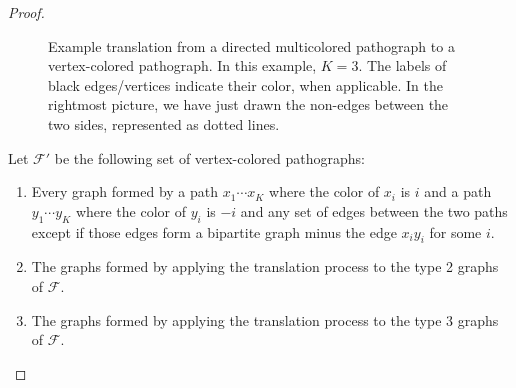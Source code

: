 \documentclass{article}
\newcommand{\alabvert}[4]{\node[dot, label={[label distance=-2pt] #4:{$#3$}}] (#1) at (#2) {};}
\newcommand{\edge}[2]{\draw (#1) -- (#2);}
\newcommand{\Fc}{\mathcal{F}}
\begin{document}
\begin{proof}
\begin{figure}[htbp!]
    \caption{Example translation from a directed multicolored pathograph to a vertex-colored pathograph. In this example, $K=3$. The labels of black edges/vertices indicate their color, when applicable. In the rightmost picture, we have just drawn the non-edges between the two sides, represented as dotted lines.}
    \label{fig:vcolor}
\end{figure}

Let $\Fc'$ be the following set of vertex-colored pathographs:
\begin{enumerate}
    \item Every graph formed by a path $x_1\cdots x_K$ where the color of $x_i$ is $i$ and a path $y_1\cdots y_K$ where the color of $y_i$ is $-i$ and any set of edges between the two paths except if those edges form a bipartite graph minus the edge $x_iy_i$ for some $i$.
    \item The graphs formed by applying the translation process to the type 2 graphs of $\Fc$.
    \item The graphs formed by applying the translation process to the type 3 graphs of $\Fc$.
\end{enumerate}


\end{proof}
\end{document}
